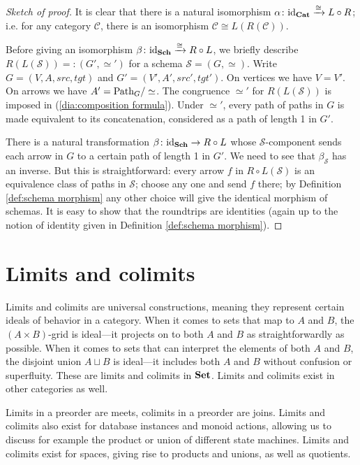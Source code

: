 \documentclass{book}
\def\tn{\textnormal}
\def\mc{\mathcal}
\def\Path{\tn{Path}}
\def\to{\rightarrow}
\def\taking{\colon}
\def\iso{\cong}
\newcommand{\To}[1]{\xrightarrow{#1}}
\def\id{\tn{id}}
\def\Cat{{\bf Cat}}
\def\Set{{\bf Set}}
\def\mcC{\mc{C}}
\def\mcS{\mc{S}}
\theoremstyle{remark}
\theoremstyle{definition}
\def\Sch{{\bf Sch}}
\begin{document}
\begin{proof}[Sketch of proof]

It is clear that there is a natural isomorphism $\alpha\taking\id_\Cat\To{\iso} L\circ R$; i.e. for any category $\mcC$, there is an isomorphism $\mcC\iso L(R(\mcC))$. 

Before giving an isomorphism $\beta\taking\id_\Sch\To{\iso}R\circ L$, we briefly describe $R(L(\mcS))=:(G',\simeq')$ for a schema $\mcS=(G,\simeq)$. Write $G=(V,A,src,tgt)$ and $G'=(V',A',src',tgt')$. On vertices we have $V=V'$. On arrows we have $A'=\Path_G/\simeq$. The congruence $\simeq'$ for $R(L(\mcS))$ is imposed in (\ref{dia:composition formula}). Under $\simeq'$, every path of paths in $G$ is made equivalent to its concatenation, considered as a path of length 1 in $G'$. 

There is a natural transformation $\beta\taking\id_\Sch\to R\circ L$ whose $\mcS$-component sends each arrow in $G$ to a certain path of length 1 in $G'$. We need to see that $\beta_\mcS$ has an inverse. But this is straightforward: every arrow $f$ in $R\circ L(\mcS)$ is an  equivalence class of paths in $\mcS$; choose any one and send $f$ there; by Definition \ref{def:schema morphism} any other choice will give the identical morphism of schemas. It is easy to show that the roundtrips are identities (again up to the notion of identity given in Definition \ref{def:schema morphism}).

\end{proof}


\section{Limits and colimits}

Limits and colimits are universal constructions, meaning they represent certain ideals of behavior in a category. When it comes to sets that map to $A$ and $B$, the $(A\times B)$-grid is ideal---it projects on to both $A$ and $B$ as straightforwardly as possible. When it comes to sets that can interpret the elements of both $A$ and $B$, the disjoint union $A\sqcup B$ is ideal---it includes both $A$ and $B$ without confusion or superfluity. These are limits and colimits in $\Set$. Limits and colimits exist in other categories as well.

Limits in a preorder are meets, colimits in a preorder are joins. Limits and colimits also exist for database instances and monoid actions, allowing us to discuss for example the product or union of different state machines. Limits and colimits exist for spaces, giving rise to products and unions, as well as quotients.
\end{document}
